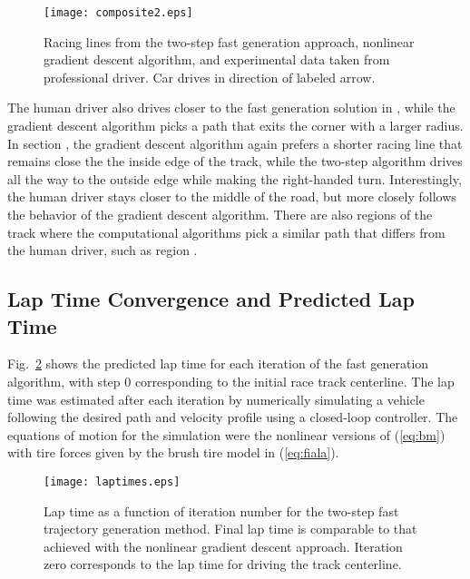  \begin{figure}[tb]
\centering
\texttt{[image: composite2.eps]}
\caption[Racing lines from the two-step fast generation approach, nonlinear gradient descent algorithm, and experimental data taken
from professional driver.]{Racing lines from the two-step fast generation approach, nonlinear gradient descent algorithm, and experimental data taken
from professional driver. Car drives in direction of labeled arrow.}
\label{compositeFig2}
\end{figure}	

 The human driver also drives closer to the 
fast generation solution in , while the gradient descent algorithm picks a path that exits the corner with a larger radius. In section , the gradient descent
algorithm again prefers a shorter racing line that remains close the the inside edge of the track, while the two-step algorithm drives all the way
to the outside edge while making the right-handed turn. Interestingly, the human driver stays closer to the middle of the road, but more closely
follows the behavior of the gradient descent algorithm. There are also regions of the track where the computational algorithms pick a similar path that 
differs from the human driver, such as region .
 
\subsection{Lap Time Convergence and Predicted Lap Time}
Fig.~\ref{lapTimes} shows the predicted lap time for each iteration of the fast generation algorithm, with step 0 corresponding
to the initial race track centerline. The lap time was estimated after each iteration by numerically simulating a vehicle 
 following the desired path and velocity profile using a closed-loop controller. The equations of motion for the simulation
were the nonlinear versions of (\ref{eq:bm}) with tire forces given by
the brush tire model in (\ref{eq:fiala}). 

\begin{figure}
\centering
\texttt{[image: laptimes.eps]}
\caption[Lap time as a function of iteration for the two-step fast trajectory generation method.]{Lap time as a function of iteration number for the two-step fast trajectory generation method. Final lap time is comparable
to that achieved with the nonlinear gradient descent approach. Iteration zero corresponds to the lap time for driving the track centerline.}
\label{lapTimes}
\end{figure}


